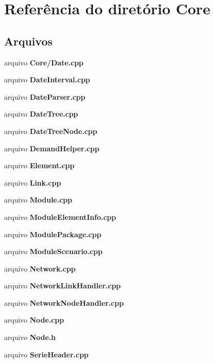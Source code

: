 \section{Referência do diretório Core}
\label{dir_a2f0e5642e47e7ed59fe0f0829eafb5f}
\subsection*{Arquivos}
\begin{DoxyCompactItemize}
\item 
arquivo {\bf Core/\+Date.\+cpp}
\item 
arquivo {\bf Date\+Interval.\+cpp}
\item 
arquivo {\bf Date\+Parser.\+cpp}
\item 
arquivo {\bf Date\+Tree.\+cpp}
\item 
arquivo {\bf Date\+Tree\+Node.\+cpp}
\item 
arquivo {\bf Demand\+Helper.\+cpp}
\item 
arquivo {\bf Element.\+cpp}
\item 
arquivo {\bf Link.\+cpp}
\item 
arquivo {\bf Module.\+cpp}
\item 
arquivo {\bf Module\+Element\+Info.\+cpp}
\item 
arquivo {\bf Module\+Package.\+cpp}
\item 
arquivo {\bf Module\+Scenario.\+cpp}
\item 
arquivo {\bf Network.\+cpp}
\item 
arquivo {\bf Network\+Link\+Handler.\+cpp}
\item 
arquivo {\bf Network\+Node\+Handler.\+cpp}
\item 
arquivo {\bf Node.\+cpp}
\item 
arquivo {\bf Node.\+h}
\item 
arquivo {\bf Serie\+Header.\+cpp}
\end{DoxyCompactItemize}
